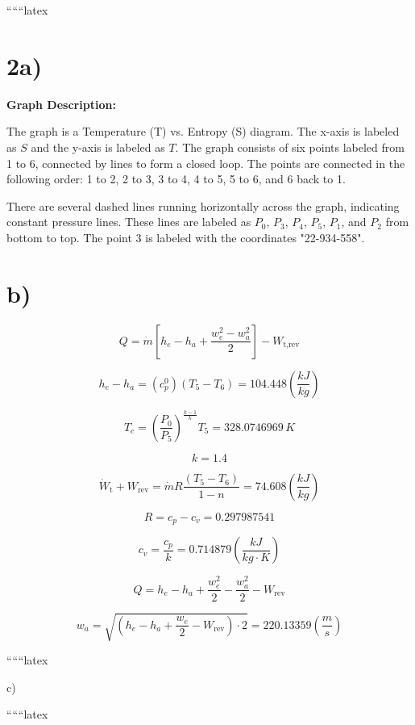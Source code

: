 
``````latex


\section*{2a)}

\begin{center}
\textbf{Graph Description:}
\end{center}

The graph is a Temperature (T) vs. Entropy (S) diagram. The x-axis is labeled as \( S \) and the y-axis is labeled as \( T \). The graph consists of six points labeled from 1 to 6, connected by lines to form a closed loop. The points are connected in the following order: 1 to 2, 2 to 3, 3 to 4, 4 to 5, 5 to 6, and 6 back to 1. 

There are several dashed lines running horizontally across the graph, indicating constant pressure lines. These lines are labeled as \( P_0 \), \( P_3 \), \( P_4 \), \( P_5 \), \( P_1 \), and \( P_2 \) from bottom to top. The point 3 is labeled with the coordinates "22-934-558".

\section*{b)}

\[
Q = \dot{m} \left[ h_e - h_a + \frac{w_e^2 - w_a^2}{2} \right] - W_{\text{t,rev}}
\]

\[
h_e - h_a = (c_p^0) (T_5 - T_6) = 104.448 \left( \frac{kJ}{kg} \right)
\]

\[
T_c = \left( \frac{P_0}{P_5} \right)^{\frac{k-1}{k}} T_5 = 328.0746969 \, K
\]

\[
k = 1.4
\]

\[
\dot{W}_{\text{t}} + W_{\text{rev}} = \dot{m} R \frac{(T_5 - T_6)}{1 - n} = 74.608 \left( \frac{kJ}{kg} \right)
\]

\[
R = c_p - c_v = 0.297987541
\]

\[
c_v = \frac{c_p}{k} = 0.714879 \left( \frac{kJ}{kg \cdot K} \right)
\]

\[
Q = h_e - h_a + \frac{w_e^2}{2} - \frac{w_a^2}{2} - W_{\text{rev}}
\]

\[
w_a = \sqrt{(h_e - h_a + \frac{w_e}{2} - W_{\text{rev}}) \cdot 2} = 220.13359 \left( \frac{m}{s} \right)
\]

``````latex


c)

``````latex


